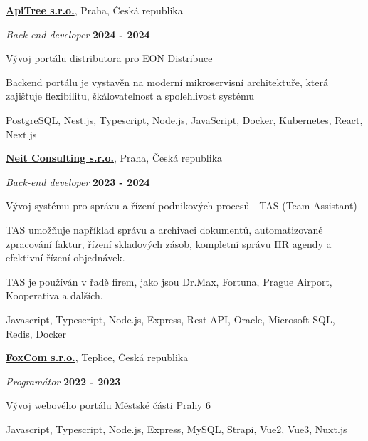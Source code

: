 \documentclass[10pt]{article}
\newenvironment{outerlist}[0]%
        {\begin{itemize}}
	{\end{itemize}
         \vspace{-.6\baselineskip}}
\newenvironment{innerlist}[0]%
        {\begin{compactitem}}
	{\end{compactitem}}
\newcommand{\blankline}{\quad\pagebreak[2]}
\begin{document}
\href{http://www.apitree.cz}{\textbf{ApiTree s.r.o.}}, 
Praha, Česká republika

\begin{outerlist}
	\item[] \textit{Back-end developer}%
		\hfill \textbf{2024 - 2024}
	\begin{innerlist}
		\item Vývoj portálu distributora pro EON Distribuce
		\item Backend portálu je vystavěn na moderní mikroservisní architektuře, která zajišťuje flexibilitu, škálovatelnost a spolehlivost systému
		\item PostgreSQL, Nest.js, Typescript, Node.js, JavaScript, Docker, Kubernetes, React, Next.js	
		
	\end{innerlist}
\end{outerlist}
\blankline

\href{http://www.neit.cz}{\textbf{Neit Consulting s.r.o.}}, 
Praha, Česká republika

\begin{outerlist}
	\item[] \textit{Back-end developer}%
		\hfill \textbf{2023 - 2024}
	\begin{innerlist}
		\item Vývoj systému pro správu a řízení podnikových procesů - TAS (Team Assistant)
		\item TAS umožňuje například správu a archivaci dokumentů, automatizované zpracování faktur, řízení skladových zásob, kompletní správu HR agendy a efektivní řízení objednávek.
		\item TAS je používán v řadě firem, jako jsou Dr.Max, Fortuna, Prague Airport, Kooperativa a dalších.		
		\item Javascript, Typescript, Node.js, Express, Rest API, Oracle, Microsoft SQL, Redis, Docker	
		
	\end{innerlist}
\end{outerlist}
\blankline

\href{http://www.foxcom.eu}{\textbf{FoxCom s.r.o.}}, 
Teplice, Česká republika

\begin{outerlist}
	\item[] \textit{Programátor}%
		\hfill \textbf{2022 - 2023}
	\begin{innerlist}
		\item Vývoj webového portálu Městské části Prahy 6	
		\item Javascript, Typescript, Node.js, Express, MySQL, Strapi, Vue2, Vue3, Nuxt.js
		
	\end{innerlist}
\end{outerlist}
\blankline
\end{document}
